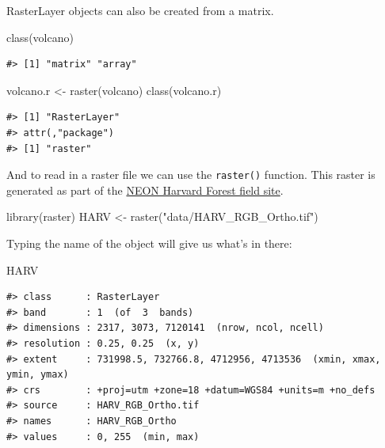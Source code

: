 \documentclass[
  11pt,
]{book}
\newenvironment{Shaded}{\begin{snugshade}}{\end{snugshade}}
\newcommand{\FunctionTok}[1]{\textcolor[rgb]{0.00,0.00,0.00}{#1}}
\newcommand{\NormalTok}[1]{#1}
\newcommand{\OtherTok}[1]{\textcolor[rgb]{0.56,0.35,0.01}{#1}}
\newcommand{\StringTok}[1]{\textcolor[rgb]{0.31,0.60,0.02}{#1}}
\begin{document}
RasterLayer objects can also be created from a matrix.

\begin{Shaded}
\begin{Highlighting}[]
\FunctionTok{class}\NormalTok{(volcano)}
\end{Highlighting}
\end{Shaded}

\begin{verbatim}
#> [1] "matrix" "array"
\end{verbatim}

\begin{Shaded}
\begin{Highlighting}[]
\NormalTok{volcano.r }\OtherTok{\textless{}{-}} \FunctionTok{raster}\NormalTok{(volcano)}
\FunctionTok{class}\NormalTok{(volcano.r)}
\end{Highlighting}
\end{Shaded}

\begin{verbatim}
#> [1] "RasterLayer"
#> attr(,"package")
#> [1] "raster"
\end{verbatim}

And to read in a raster file we can use the \texttt{raster()} function. This raster is generated as part of the \href{https://www.neonscience.org/field-sites/field-sites-map/HARV}{NEON Harvard Forest field site}.

\begin{Shaded}
\begin{Highlighting}[]
\FunctionTok{library}\NormalTok{(raster)}
\NormalTok{HARV }\OtherTok{\textless{}{-}} \FunctionTok{raster}\NormalTok{(}\StringTok{"data/HARV\_RGB\_Ortho.tif"}\NormalTok{)}
\end{Highlighting}
\end{Shaded}

Typing the name of the object will give us what's in there:

\begin{Shaded}
\begin{Highlighting}[]
\NormalTok{HARV}
\end{Highlighting}
\end{Shaded}

\begin{verbatim}
#> class      : RasterLayer 
#> band       : 1  (of  3  bands)
#> dimensions : 2317, 3073, 7120141  (nrow, ncol, ncell)
#> resolution : 0.25, 0.25  (x, y)
#> extent     : 731998.5, 732766.8, 4712956, 4713536  (xmin, xmax, ymin, ymax)
#> crs        : +proj=utm +zone=18 +datum=WGS84 +units=m +no_defs 
#> source     : HARV_RGB_Ortho.tif 
#> names      : HARV_RGB_Ortho 
#> values     : 0, 255  (min, max)
\end{verbatim}
\end{document}
